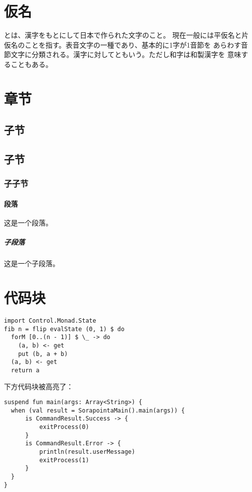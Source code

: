 \documentclass[
  fontset = none,
  punct   = kaiming,
]{ctexart}
\renewcommand{\emph}[1]{\textbf{#1}}
\begin{document}
\newpage
\gothic
\section{仮名} \label{sec:kana}

\emph{}とは、漢字をもとにして日本で作られた文字のこと。
現在一般には平仮名と片仮名のことを指す。表音文字の一種であり、基本的に1字が1音節を
あらわす音節文字に分類される。漢字に対してともいう。ただし和字は和製漢字を
意味することもある。

\newpage
\sans
\section{章节}

\subsection{子节}
\subsection{子节}
\subsubsection{子子节}

\paragraph{段落} 这是一个段落。
\subparagraph{子段落} 这是一个子段落。

\newpage
\section{代码块}

\begin{verbatim}
import Control.Monad.State
fib n = flip evalState (0, 1) $ do
  forM [0..(n - 1)] $ \_ -> do
    (a, b) <- get
    put (b, a + b)
  (a, b) <- get
  return a
\end{verbatim}

下方代码块被高亮了：

\begin{verbatim}
suspend fun main(args: Array<String>) {
  when (val result = SorapointaMain().main(args)) {
      is CommandResult.Success -> {
          exitProcess(0)
      }
      is CommandResult.Error -> {
          println(result.userMessage)
          exitProcess(1)
      }
  }
}
\end{verbatim}
\end{document}
